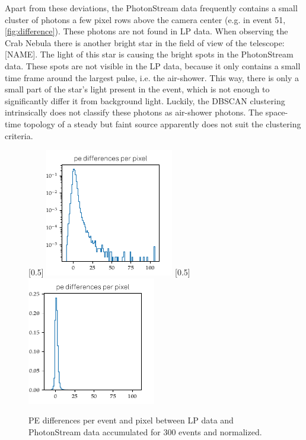 Apart from these deviations, the PhotonStream data frequently contains a small
cluster of photons a few pixel rows above the camera center (e.g. in event 51,
\autoref{fig:difference}). These photons are not found in LP data. When
observing the Crab Nebula there is another bright star in the field of view of
the telescope: [NAME]. The light of this star is causing the bright spots in
the PhotonStream data. These spots are not visible in the LP data, because
it only contains a small time frame around the largest pulse, i.e. the
air-shower. This way, there is only a small part of the star's light present in
the event, which is not enough to significantly differ it from background
light. Luckily, the DBSCAN clustering intrinsically does not classify these
photons as air-shower photons. The space-time topology of a steady but faint
source apparently does not suit the clustering criteria.
%
\begin{figure}
  [0.5\textwidth]{
    \includegraphics[width=0.5\textwidth]{Plots/diffs_hist_DBSCAN_pe_20131104_162_logy.pdf}
  }
  [0.5\textwidth]{
    \includegraphics[width=0.5\textwidth]{Plots/diffs_hist_DBSCAN_pe_20131104_162.pdf}
  }
  \caption{PE differences per event and pixel between LP data and PhotonStream data accumulated for 300 events and normalized.}
\end{figure}
%

